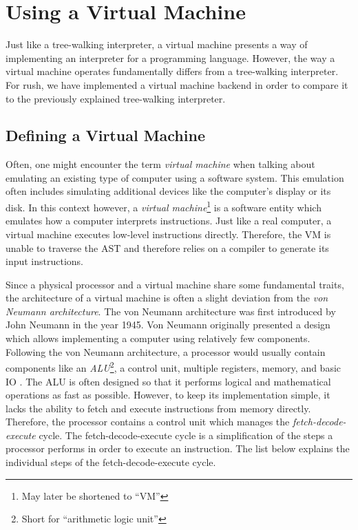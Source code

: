 \newpage
\section{Using a Virtual Machine}

Just like a tree-walking interpreter, a virtual machine presents a way of implementing an interpreter for a programming language.
However, the way a virtual machine operates fundamentally differs from a tree-walking interpreter.
For rush, we have implemented a virtual machine backend in order to compare it to the previously explained tree-walking interpreter.

\subsection{Defining a Virtual Machine}

Often, one might encounter the term \emph{virtual machine} when talking about emulating an existing type of computer using a software system.
This emulation often includes simulating additional devices like the computer's display or its disk.
In this context however, a \emph{virtual machine}\footnote{May later be shortened to \enquote{VM}} is a software entity which emulates how a computer interprets instructions.
Just like a real computer, a virtual machine executes low-level instructions directly.
Therefore, the VM is unable to traverse the AST and therefore relies on a compiler to generate its input instructions.

Since a physical processor and a virtual machine share some fundamental traits,
the architecture of a virtual machine is often a slight deviation from the \emph{von Neumann architecture}.
The von Neumann architecture was first introduced by John Neumann in the year 1945.
Von Neumann originally presented a design which allows implementing a computer using relatively few components.
Following the von Neumann architecture, a processor would usually contain components like an \emph{ALU}\footnote{Short for \enquote{arithmetic logic unit}}, a control unit, multiple registers, memory, and basic IO \cite[p.~172]{Ledin2020-yp}.
The ALU is often designed so that it performs logical and mathematical operations as fast as possible.
However, to keep its implementation simple, it lacks the ability to fetch and execute instructions from memory directly.
Therefore, the processor contains a control unit which manages the \emph{fetch-decode-execute} cycle.
The fetch-decode-execute cycle is a simplification of the steps a processor performs in order to execute an instruction.
The list below explains the individual steps of the fetch-decode-execute cycle.

